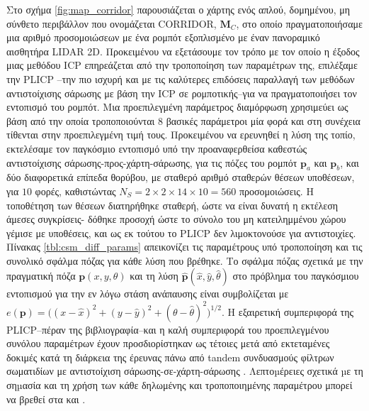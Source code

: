 Στο σχήμα \ref{fig:map_corridor} παρουσιάζεται ο χάρτης ενός απλού, δομημένου,
μη σύνθετο περιβάλλον που ονομάζεται CORRIDOR, $\bm{M}_C$, στο οποίο πραγματοποιήσαμε μια
αριθμό προσομοιώσεων με ένα ρομπότ εξοπλισμένο με έναν πανοραμικό αισθητήρα LIDAR 2D.
Προκειμένου να εξετάσουμε τον τρόπο με τον οποίο η έξοδος μιας μεθόδου ICP επηρεάζεται από την
τροποποίηση των παραμέτρων της, επιλέξαμε την PLICP \cite{plicp}--την πιο ισχυρή
και με τις καλύτερες επιδόσεις παραλλαγή των μεθόδων αντιστοίχισης σάρωσης με βάση την ICP σε
ρομποτικής--για να πραγματοποιήσει τον εντοπισμό του ρομπότ. Μια προεπιλεγμένη παράμετρος
διαμόρφωση χρησιμεύει ως βάση από την οποία τροποποιούνται $8$ βασικές παράμετροι
μία φορά και στη συνέχεια τίθενται στην προεπιλεγμένη τιμή τους. Προκειμένου να ερευνηθεί η λύση της
τοπίο, εκτελέσαμε τον παγκόσμιο εντοπισμό υπό την προαναφερθείσα
καθεστώς αντιστοίχισης σάρωσης-προς-χάρτη-σάρωσης, για τις πόζες του ρομπότ $\bm{p}_a$ και $\bm{p}_b$,
και δύο διαφορετικά επίπεδα θορύβου, με σταθερό αριθμό σταθερών θέσεων
υποθέσεων, για $10$ φορές, καθιστώντας $N_S = 2 \times 2 \times 14 \times 10 = 560$
προσομοιώσεις.  Η τοποθέτηση των θέσεων διατηρήθηκε σταθερή, ώστε να είναι δυνατή η εκτέλεση
άμεσες συγκρίσεις- δόθηκε προσοχή ώστε το σύνολο του μη κατειλημμένου χώρου
γέμισε με υποθέσεις, και ως εκ τούτου το PLICP δεν λιμοκτονούσε για αντιστοιχίες. Πίνακας
\ref{tbl:csm_diff_params} απεικονίζει τις παραμέτρους υπό τροποποίηση και τις
συνολικό σφάλμα πόζας για κάθε λύση που βρέθηκε.  Το σφάλμα πόζας σχετικά με την πραγματική πόζα
$\bm{p}(x,y,\theta)$ και τη λύση $\bm{\hat{p}}(\hat{x}, \hat{y},
\hat{\theta})$ στο πρόβλημα του παγκόσμιου εντοπισμού για την εν λόγω στάση ανάπαυσης είναι
συμβολίζεται με $e(\bm{p}) = \big((x-\hat{x})^2 + (y-\hat{y})^2 + (\theta -
\hat{\theta})^2\big)^{1/2}$. Η εξαιρετική συμπεριφορά της PLICP--πέραν της
βιβλιογραφία--και η καλή συμπεριφορά του προεπιλεγμένου συνόλου παραμέτρων έχουν
προσδιορίστηκαν ως τέτοιες μετά από εκτεταμένες δοκιμές κατά τη διάρκεια της έρευνας πάνω από tandem
συνδυασμούς φίλτρων σωματιδίων με αντιστοίχιση σάρωσης-σε-χάρτη-σάρωσης
\cite{pose_selection_and_feedback_methods}. Λεπτοµέρειες σχετικά µε τη σηµασία και τη χρήση των
κάθε δηλωμένης και τροποποιημένης παραμέτρου μπορεί να βρεθεί στα \cite{csm_manual1} και
\cite{csm_manual2}.


